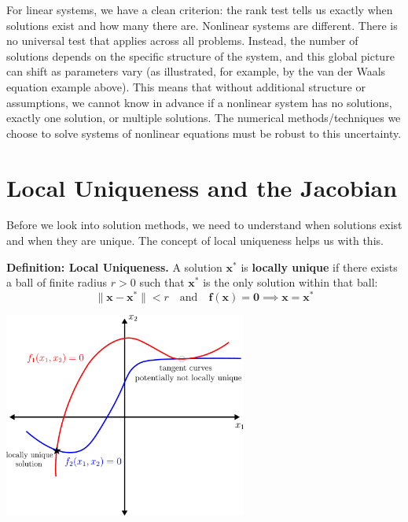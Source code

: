For linear systems, we have a clean criterion: the rank test tells us exactly when solutions exist and how many there are. Nonlinear systems are different. There is no universal test that applies across all problems. Instead, the number of solutions depends on the specific structure of the system, and this global picture can shift as parameters vary (as illustrated, for example, by the van der Waals equation example above). This means that without additional structure or assumptions, we cannot know in advance if a nonlinear system has no solutions, exactly one solution, or multiple solutions. The numerical methods/techniques we choose to solve systems of nonlinear equations must be robust to this uncertainty.

\section{Local Uniqueness and the Jacobian}

Before we look into solution methods, we need to understand when solutions exist and when they are unique. The concept of local uniqueness helps us with this.

\begin{definitionBox}
\textbf{Definition: Local Uniqueness.}
A solution $\mathbf{x}^*$ is \textbf{locally unique} if there exists a ball of finite radius $r > 0$ such that $\mathbf{x}^*$ is the only solution within that ball:
\begin{equation}
\|\mathbf{x} - \mathbf{x}^*\| < r \quad \text{and} \quad \mathbf{f}(\mathbf{x}) = \mathbf{0} \implies \mathbf{x} = \mathbf{x}^*
\end{equation}

\begin{center}
\includegraphics[width=0.6\textwidth]{figs/nle/local_uniqueness.pdf}
\end{center}
\end{definitionBox}  

